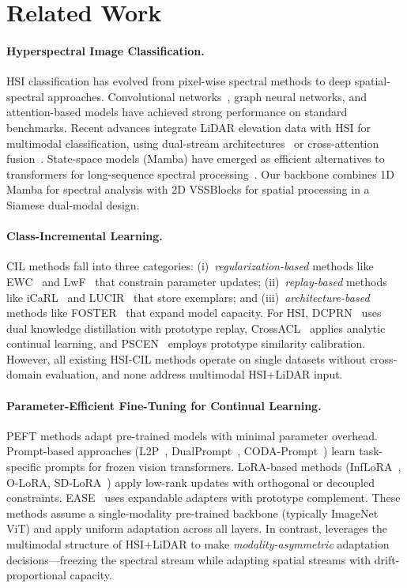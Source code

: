 \section{Related Work}
\label{sec:related}

\paragraph{Hyperspectral Image Classification.}
HSI classification has evolved from pixel-wise spectral methods to deep spatial-spectral approaches. Convolutional networks~\cite{chen2016deep3dcnn}, graph neural networks, and attention-based models have achieved strong performance on standard benchmarks. Recent advances integrate LiDAR elevation data with HSI for multimodal classification, using dual-stream architectures~\cite{xu2024mivit} or cross-attention fusion~\cite{hong2022multimodal}. State-space models (Mamba) have emerged as efficient alternatives to transformers for long-sequence spectral processing~\cite{yao2024spectralgpt}. Our \backbonename{} backbone combines 1D Mamba for spectral analysis with 2D VSSBlocks for spatial processing in a Siamese dual-modal design.

\paragraph{Class-Incremental Learning.}
CIL methods fall into three categories: (i)~\emph{regularization-based} methods like EWC~\cite{kirkpatrick2017ewc} and LwF~\cite{li2017lwf} that constrain parameter updates; (ii)~\emph{replay-based} methods like iCaRL~\cite{rebuffi2017icarl} and LUCIR~\cite{hou2019lucir} that store exemplars; and (iii)~\emph{architecture-based} methods like FOSTER~\cite{wang2022foster} that expand model capacity. For HSI, DCPRN~\cite{deng2024dcprn} uses dual knowledge distillation with prototype replay, CrossACL~\cite{xu2025crossacl} applies analytic continual learning, and PSCEN~\cite{pscen2025} employs prototype similarity calibration. However, all existing HSI-CIL methods operate on single datasets without cross-domain evaluation, and none address multimodal HSI+LiDAR input.

\paragraph{Parameter-Efficient Fine-Tuning for Continual Learning.}
PEFT methods adapt pre-trained models with minimal parameter overhead. Prompt-based approaches (L2P~\cite{wang2022l2p}, DualPrompt~\cite{wang2022dualprompt}, CODA-Prompt~\cite{smith2023codaprompt}) learn task-specific prompts for frozen vision transformers. LoRA-based methods (InfLoRA~\cite{liang2024inflora}, O-LoRA, SD-LoRA~\cite{sdlora2025}) apply low-rank updates with orthogonal or decoupled constraints. EASE~\cite{zhou2024ease} uses expandable adapters with prototype complement. These methods assume a single-modality pre-trained backbone (typically ImageNet ViT) and apply uniform adaptation across all layers. In contrast, \methodname{} leverages the multimodal structure of HSI+LiDAR to make \emph{modality-asymmetric} adaptation decisions---freezing the spectral stream while adapting spatial streams with drift-proportional capacity.

